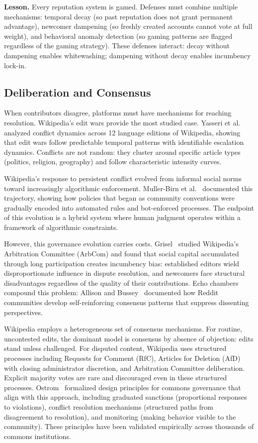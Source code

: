 \documentclass[11pt]{article}
\begin{document}
\textbf{Lesson.} Every reputation system is gamed. Defenses must combine multiple mechanisms: temporal decay (so past reputation does not grant permanent advantage), newcomer dampening (so freshly created accounts cannot vote at full weight), and behavioral anomaly detection (so gaming patterns are flagged regardless of the gaming strategy). These defenses interact: decay without dampening enables whitewashing; dampening without decay enables incumbency lock-in.

\subsection{Deliberation and Consensus}

When contributors disagree, platforms must have mechanisms for reaching resolution. Wikipedia's edit wars provide the most studied case. Yasseri et al.~\cite{yasseri2012} analyzed conflict dynamics across 12 language editions of Wikipedia, showing that edit wars follow predictable temporal patterns with identifiable escalation dynamics. Conflicts are not random: they cluster around specific article types (politics, religion, geography) and follow characteristic intensity curves.

Wikipedia's response to persistent conflict evolved from informal social norms toward increasingly algorithmic enforcement. Muller-Birn et al.~\cite{mullerbirn2013} documented this trajectory, showing how policies that began as community conventions were gradually encoded into automated rules and bot-enforced processes. The endpoint of this evolution is a hybrid system where human judgment operates within a framework of algorithmic constraints.

However, this governance evolution carries costs. Grisel~\cite{grisel2023} studied Wikipedia's Arbitration Committee (ArbCom) and found that social capital accumulated through long participation creates incumbency bias: established editors wield disproportionate influence in dispute resolution, and newcomers face structural disadvantages regardless of the quality of their contributions. Echo chambers compound this problem: Allison and Bussey~\cite{allison2020} documented how Reddit communities develop self-reinforcing consensus patterns that suppress dissenting perspectives.

Wikipedia employs a heterogeneous set of consensus mechanisms. For routine, uncontested edits, the dominant model is consensus by absence of objection: edits stand unless challenged. For disputed content, Wikipedia uses structured processes including Requests for Comment (RfC), Articles for Deletion (AfD) with closing administrator discretion, and Arbitration Committee deliberation. Explicit majority votes are rare and discouraged even in these structured processes. Ostrom~\cite{ostrom1990} formalized design principles for commons governance that align with this approach, including graduated sanctions (proportional responses to violations), conflict resolution mechanisms (structured paths from disagreement to resolution), and monitoring (making behavior visible to the community). These principles have been validated empirically across thousands of commons institutions.
\end{document}

